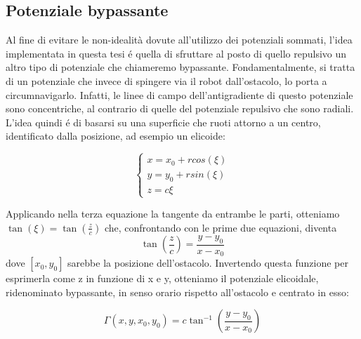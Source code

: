 \documentclass[14pt,a4paper]{extarticle}
\begin{document}
\subsection{Potenziale bypassante}
Al fine di evitare le non-idealità dovute all'utilizzo dei potenziali sommati, l'idea implementata in questa tesi é quella di sfruttare al posto di quello repulsivo un altro tipo di potenziale che chiameremo bypassante. Fondamentalmente, si tratta di un potenziale che invece di spingere via il robot dall'ostacolo, lo porta a circumnavigarlo. Infatti, le linee di campo dell'antigradiente di questo potenziale sono concentriche, al contrario di quelle del potenziale repulsivo che sono radiali. L'idea quindi é di basarsi su una superficie che ruoti attorno a un centro, identificato dalla posizione, ad esempio un elicoide:

\begin{equation}
\begin{cases}
x = x_0 + r cos(\xi) \\
y = y_0 + r sin(\xi)  \\
z = c \xi
\end{cases}
\end{equation}

Applicando nella terza equazione la tangente da entrambe le parti, otteniamo \(\tan(\xi)=\tan(\frac{z}{c})\) che, confrontando con le prime due equazioni, diventa
\[\tan \left( \frac{z}{c} \right) = \frac{y-y_0}{x-x_0}\] dove \([x_0,y_0]\) sarebbe la posizione dell'ostacolo. Invertendo questa funzione per esprimerla come z in funzione di x e y, otteniamo il potenziale elicoidale, ridenominato bypassante, in senso orario rispetto all'ostacolo e centrato in esso:

\begin{equation}
\label{potBeq}
\Gamma(x,y,x_0,y_0) = c\tan^{-1} \left( \frac{y-y_0}{x-x_0} \right)
\end{equation}
\end{document}
